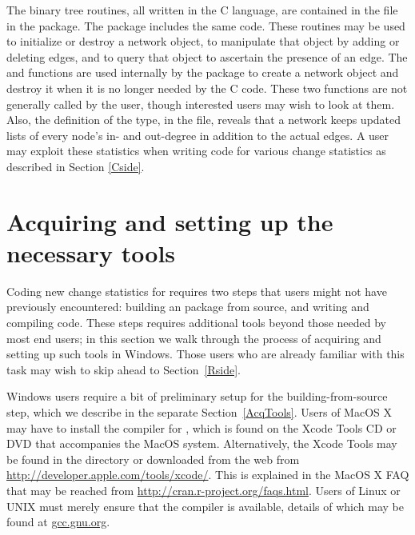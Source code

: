 \documentclass[nojss]{jss}
\begin{document}
The binary tree routines, all written in the C language, are contained in the
 file in the  package. The  package
includes the same code.  These routines may be used to initialize or destroy
a network object, to manipulate that object by adding or deleting edges, and to
query that object to ascertain the presence of an edge.
The  and  functions
are used internally by the  package to create a network object
and destroy it when it is no longer needed by the C code.  These two functions
are not generally called by the user, though interested users may wish
to look at them.  Also, the definition of the  type, in the
 file, reveals that a network keeps updated lists of every node's
in- and out-degree in addition to the actual edges.  A user may exploit these statistics
when writing code for various change statistics as described in Section \ref{Cside}.

\section{Acquiring and setting up the necessary tools}
\label{Tools}

Coding new change statistics for  requires two steps that users might not have previously encountered: building an  package from source, and writing and compiling  code. These steps requires additional tools beyond those needed by most  end users; in this section we walk through the process of acquiring and setting up such tools in Windows. Those users who are already familiar with this task may wish to skip ahead to Section~\ref{Rside}.

Windows users require a bit of preliminary setup for the building-from-source
step, which we describe in the separate Section~\ref{AcqTools}.  Users of MacOS X
may have to install the 
compiler for , which is found on the Xcode Tools CD or
DVD that accompanies the MacOS system.  Alternatively, the Xcode Tools may
be found in the  directory or downloaded from the
web from \url{http://developer.apple.com/tools/xcode/}.  This is explained in the
 MacOS X FAQ that may be reached from
\url{http://cran.r-project.org/faqs.html}.  Users of Linux or UNIX must merely
ensure that the  compiler is available, details of which may be
found at \url{gcc.gnu.org}.
\end{document}
